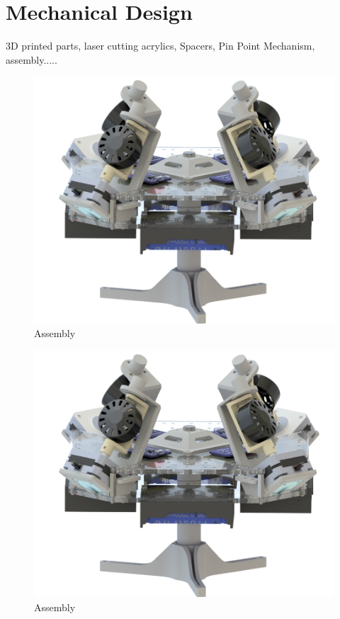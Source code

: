 \chapter{Mechanical Design}
\label{chap:7}

3D printed parts, laser cutting acrylics, Spacers, Pin Point Mechanism, assembly.....

\begin{figure}
    \centering
    \includegraphics[width=\textwidth]{figures/Assembly/AssemblyACR - Transperent.png}
    \caption{Assembly}
    \label{fig:my_AssemblyACR}
\end{figure}

\begin{figure}
    \centering
    \includegraphics[width=\textwidth]{figures/Assembly/AssemblyACR - Transperent.png}
    \caption{Assembly}
    \label{fig:my_AssemblyACR}
\end{figure}